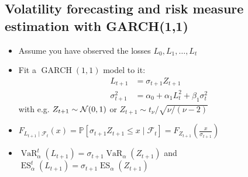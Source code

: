 \subsection*{Volatility forecasting and risk measure estimation with GARCH(1,1)}
\begin{itemize}[leftmargin=*]
    \item Assume you have observed the losses $L_{0}, L_{1}, \ldots, L_{t}$
    \item Fit a $\operatorname{GARCH}(1,1)$ model to it:
$$
\begin{aligned}
L_{t+1} &=\sigma_{t+1} Z_{t+1} \\
\sigma_{t+1}^{2} &=\alpha_{0}+\alpha_{1} L_{t}^{2}+\beta_{1} \sigma_{t}^{2}
\end{aligned}
$$
with e.g. $Z_{t+1} \sim \operatorname{\mathcal{N}}(0,1)$ or $Z_{t+1} \sim t_{\nu} / \sqrt{\nu /(\nu-2)}$

    \item $
F_{L_{t+1} \mid \mathcal{F}_{t}}(x)=\mathbb{P}\left[\sigma_{t+1} Z_{t+1} \leq x \mid \mathcal{F}_{t}\right]=F_{Z_{t+1}}\left(\frac{x}{\sigma_{t+1}}\right)
$
    \item $
\operatorname{VaR}_{\alpha}^{t}\left(L_{t+1}\right)=\sigma_{t+1} \operatorname{VaR}_{\alpha}\left(Z_{t+1}\right)$ and $ \operatorname{ES}_{\alpha}^{t}\left(L_{t+1}\right)=\sigma_{t+1} \operatorname{ES}_{\alpha}\left(Z_{t+1}\right)
$
\end{itemize}
